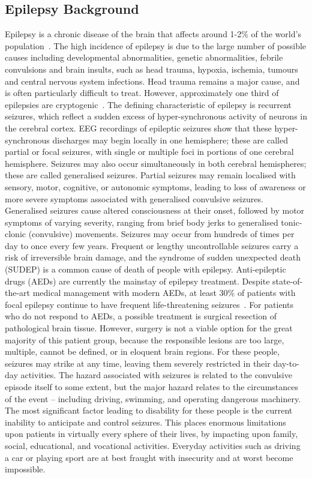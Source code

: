 \documentclass[]{article}
\begin{document}
\subsection{Epilepsy Background}
Epilepsy is a chronic disease of the brain that affects around 1-2\% of the world’s population~\cite{Beran1985,Dua2006}. The high incidence of epilepsy is due to the large number of possible causes including developmental abnormalities, genetic abnormalities, febrile convulsions and brain insults, such as head trauma, hypoxia, ischemia, tumours and central nervous system infections. Head trauma remains a major cause, and is often particularly difficult to treat. However, approximately one third of epilepsies are cryptogenic~\cite{Theodore2006}.
The defining characteristic of epilepsy is recurrent seizures, which reflect a sudden excess of hyper-synchronous activity of neurons in the cerebral cortex. EEG recordings of epileptic seizures show that these hyper-synchronous discharges may begin locally in one hemisphere; these are called partial or focal seizures, with single or multiple foci in portions of one cerebral hemisphere. Seizures may also occur simultaneously in both cerebral hemispheres; these are called generalised seizures. Partial seizures may remain localised with sensory, motor, cognitive, or autonomic symptoms, leading to loss of awareness or more severe symptoms associated with generalised convulsive seizures. Generalised seizures cause altered consciousness at their onset, followed by motor symptoms of varying severity, ranging from brief body jerks to generalised tonic-clonic (convulsive) movements. Seizures may occur from hundreds of times per day to once every few years. Frequent or lengthy uncontrollable seizures carry a risk of irreversible brain damage, and the syndrome of sudden unexpected death (SUDEP) is a common cause of death of people with epilepsy.
Anti-epileptic drugs (AEDs) are currently the mainstay of epilepsy treatment. Despite state-of-the-art medical management with modern AEDs, at least 30\% of patients with focal epilepsy continue to have frequent life-threatening seizures~\cite{Schmidt2005}. For patients who do not respond to AEDs, a possible treatment is surgical resection of pathological brain tissue.  However, surgery is not a viable option for the great majority of this patient group, because the responsible lesions are too large, multiple, cannot be defined, or in eloquent brain regions. For these people, seizures may strike at any time, leaving them severely restricted in their day-to-day activities. The hazard associated with seizures is related to the convulsive episode itself to some extent, but the major hazard relates to the circumstances of the event – including driving, swimming, and operating dangerous machinery. The most significant factor leading to disability for these people is the current inability to anticipate and control seizures. This places enormous limitations upon patients in virtually every sphere of their lives, by impacting upon family, social, educational, and vocational activities. Everyday activities such as driving a car or playing sport are at best fraught with insecurity and at worst become impossible.
\end{document}
